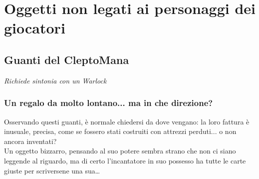 




\section{Oggetti non legati ai personaggi dei giocatori}

\subsection{Guanti del CleptoMana}
\textit{Richiede sintonia con un Warlock} 

\subsubsection{Un regalo da molto lontano... ma in che direzione?}
Osservando questi guanti, è normale chiedersi da dove vengano: la loro fattura è inusuale, precisa, come se fossero stati costruiti con attrezzi perduti... o non ancora inventati? \\
Un oggetto bizzarro, pensando al suo potere sembra strano che non ci siano leggende al riguardo, ma di certo l'incantatore in suo possesso ha tutte le carte giuste per scriversene una sua…

